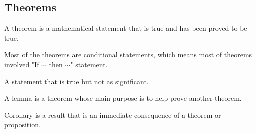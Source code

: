 \subsection{Theorems}
\begin{definition}
    [Theorem]
    A theorem is a mathematical statement that is true and has been proved to be true. 
\end{definition}
Most of the theorems are conditional statements, which means most of theorems involved "If $\cdots$ then $\cdots$" statement. 

\begin{definition}
    [Proposition]
    A statement that is true but not as significant. 
\end{definition}
\begin{definition}
    [Lemma]
    A lemma is a theorem whose main purpose is to help prove another theorem. 
\end{definition}
\begin{definition}
    [Corollary]
    Corollary is a result that is an immediate consequence of a theorem or proposition. 
\end{definition}
\newpage